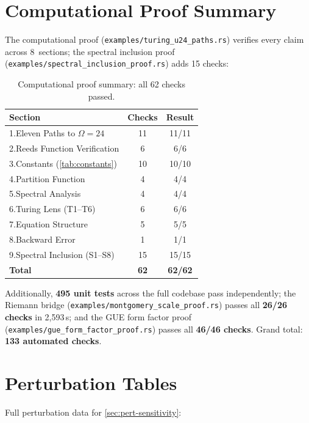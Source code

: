 \documentclass[11pt,a4paper]{article}
\theoremstyle{plain}
\theoremstyle{remark}
\renewcommand{\Omega}{\varOmega}
\begin{document}
\section{Computational Proof Summary}
\label{app:proof-summary}

The computational proof (\texttt{examples/turing\_u24\_paths.rs}) verifies
every claim across 8~sections; the spectral inclusion proof
(\texttt{examples/spectral\_inclusion\_proof.rs}) adds 15 checks:

\begin{table}[H]
\centering
\begin{tabular}{@{}lcc@{}}
\toprule
Section & Checks & Result\\
\midrule
1.\;Eleven Paths to $\Omega=24$ & 11 & 11/11\\
2.\;Reeds Function Verification & 6 & 6/6\\
3.\;Constants (\cref{tab:constants}) & 10 & 10/10\\
4.\;Partition Function & 4 & 4/4\\
5.\;Spectral Analysis & 4 & 4/4\\
6.\;Turing Lens (T1--T6) & 6 & 6/6\\
7.\;Equation Structure & 5 & 5/5\\
8.\;Backward Error & 1 & 1/1\\
9.\;Spectral Inclusion (S1--S8) & 15 & 15/15\\
\midrule
\textbf{Total} & \textbf{62} & \textbf{62/62}\\
\bottomrule
\end{tabular}
\caption{Computational proof summary: all 62 checks passed.}
\label{tab:proof-summary}
\end{table}

\noindent Additionally, \textbf{495 unit tests} across the full codebase
pass independently; the Riemann bridge
(\texttt{examples/montgomery\_scale\_proof.rs}) passes all
\textbf{26/26 checks} in 2{,}593\,s; and the GUE form factor proof
(\texttt{examples/gue\_form\_factor\_proof.rs}) passes all
\textbf{46/46 checks}.  Grand total: \textbf{133 automated checks}.

\section{Perturbation Tables}
\label{app:perturbation}

Full perturbation data for \cref{sec:pert-sensitivity}:
\end{document}
